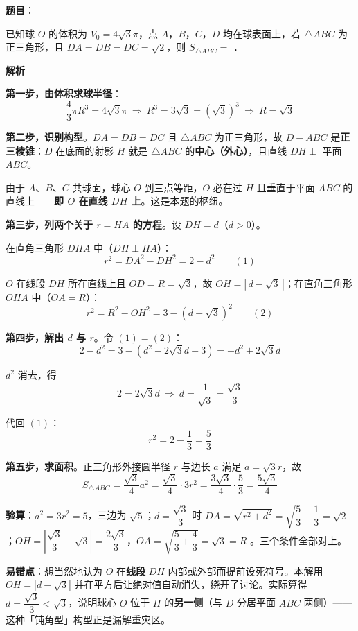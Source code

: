 \begin{answer}

\textbf{题目}：

已知球 $O$ 的体积为 $V_0=4\sqrt{3}\pi$，点 $A$，$B$，$C$，$D$ 均在球表面上，若 $\triangle ABC$ 为正三角形，且 $DA=DB=DC=\sqrt{2}$，则 $S_{\triangle ABC}=$ \gkblank{}．

\textbf{解析}

\textbf{第一步，由体积求球半径}：
\nopagebreak[4]
\[\frac43\pi R^3=4\sqrt3\pi\ \Longrightarrow\ R^3=3\sqrt3=\left(\sqrt3\right)^3\ \Longrightarrow\ R=\sqrt3\]

\textbf{第二步，识别构型}。$DA=DB=DC$ 且 $\triangle ABC$ 为正三角形，故 $D-ABC$ 是\textbf{正三棱锥}：$D$ 在底面的射影 $H$ 就是 $\triangle ABC$ 的\textbf{中心（外心）}，且直线 $DH\perp$ 平面 $ABC$。

由于 $A$、$B$、$C$ 共球面，球心 $O$ 到三点等距，$O$ 必在过 $H$ 且垂直于平面 $ABC$ 的直线上——\textbf{即 $O$ 在直线 $DH$ 上}。这是本题的枢纽。

\textbf{第三步，列两个关于 $r=HA$ 的方程}。设 $DH=d$（$d>0$）。

在直角三角形 $DHA$ 中（$DH\perp HA$）：
\nopagebreak[4]
\[r^2=DA^2-DH^2=2-d^2\qquad(1)\]

$O$ 在线段 $DH$ 所在直线上且 $OD=R=\sqrt3$，故 $OH=\left|\,d-\sqrt3\,\right|$；在直角三角形 $OHA$ 中（$OA=R$）：
\nopagebreak[4]
\[r^2=R^2-OH^2=3-\left(d-\sqrt3\right)^2\qquad(2)\]

\textbf{第四步，解出 $d$ 与 $r$}。令 $(1)=(2)$：
\nopagebreak[4]
\[2-d^2=3-\left(d^2-2\sqrt3d+3\right)=-d^2+2\sqrt3d\]

$d^2$ 消去，得
\nopagebreak[4]
\[2=2\sqrt3d\ \Longrightarrow\ d=\frac{1}{\sqrt3}=\frac{\sqrt3}{3}\]

代回 $(1)$：
\nopagebreak[4]
\[r^2=2-\frac13=\frac53\]

\textbf{第五步，求面积}。正三角形外接圆半径 $r$ 与边长 $a$ 满足 $a=\sqrt3r$，故
\nopagebreak[4]
\[S_{\triangle ABC}=\frac{\sqrt3}{4}a^2=\frac{\sqrt3}{4}\cdot3r^2=\frac{3\sqrt3}{4}\cdot\frac53=\frac{5\sqrt3}{4}\]

\begin{gktip}
\textbf{验算}：$a^2=3r^2=5$，三边为 $\sqrt5$；$d=\dfrac{\sqrt3}{3}$ 时 $DA=\sqrt{r^2+d^2}=\sqrt{\dfrac53+\dfrac13}=\sqrt2$ ；$OH=\left|\dfrac{\sqrt3}{3}-\sqrt3\right|=\dfrac{2\sqrt3}{3}$，$OA=\sqrt{\dfrac53+\dfrac43}=\sqrt3=R$ 。三个条件全部对上。

\textbf{易错点}：想当然地认为 $O$ 在\textbf{线段} $DH$ 内部或外部而提前设死符号。本解用 $OH=\left|d-\sqrt3\right|$ 并在平方后让绝对值自动消失，绕开了讨论。实际算得 $d=\dfrac{\sqrt3}{3}<\sqrt3$，说明球心 $O$ 位于 $H$ 的\textbf{另一侧}（与 $D$ 分居平面 $ABC$ 两侧）——这种「钝角型」构型正是漏解重灾区。
\end{gktip}


\par\medskip

\end{answer}
